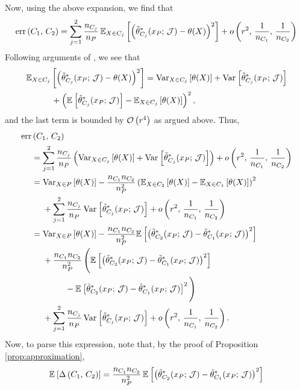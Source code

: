 \documentclass[aos]{imsart}
\theoremstyle{plain}
\theoremstyle{definition}
\theoremstyle{remark}
\begin{document}
\begin{CJK}{UTF8}{gbsn}
{\begin{appendix}
Now, using the above expansion, we find that
\begin{equation*}
\err\p{C_1, \, C_2}  = \sum_{j = 1}^2 \frac{n_{C_j}}{n_P}  \, \EE[X \in C_j]{\p{\ttheta_{C_j}^*(x_P;\,\mathcal{J}) - \theta(X)}^2} +o\p{r^2, \, \frac{1}{n_{C_1}}, \, \frac{1}{n_{C_2}}} 
\end{equation*}
Following arguments of \citet{athey2016recursive}, we see that
\begin{equation*}
\begin{split}
&\EE[X \in C_j]{\p{\ttheta_{C_j}^*(x_P;\,\mathcal{J}) - \theta(X)}^2} = \Var[X \in C_j]{\theta(X)} + \Var{\ttheta_{C_j}^*(x_P;\,\mathcal{J})} \\
&\ \ \ \ \ \ \ \ \ + \p{\EE{\ttheta_{C_j}^*(x_P;\,\mathcal{J})} - \EE[X \in C_j]{\theta(X)}}^2,
\end{split}
\end{equation*}
and the last term is bounded by $\mathcal{O}\left(r^4\right)$ as argued above. Thus,
\begin{align*}
\err&\p{C_1, \, C_2} \\
&= \sum_{j = 1}^2 \frac{n_{C_j}}{n_P} \p{ \Var[X \in C_j]{\theta(X)} + \Var{\ttheta_{C_j}^*(x_P;\,\mathcal{J})} } + o\p{r^2, \, \frac{1}{n_{C_1}}, \, \frac{1}{n_{C_2}}} \\
&= \Var[X \in P]{\theta(X)} - \frac{n_{C_1}n_{C_2}}{n_P^2} \p{\EE[X \in C_2]{\theta(X)} - \EE[X \in C_1]{\theta(X)}}^2  \\
& \ \ \ \  + \sum_{j = 1}^2 \frac{n_{C_j}}{n_P}  \Var{\ttheta_{C_j}^*(x_P;\,\mathcal{J})} + o\p{r^2, \, \frac{1}{n_{C_1}}, \, \frac{1}{n_{C_2}}} \\
&= \Var[X \in P]{\theta(X)} - \frac{n_{C_1}n_{C_2}}{n_P^2}\EE{\p{\ttheta_{C_2}^*(x_P;\,\mathcal{J}) - \ttheta_{C_1}^*(x_P;\,\mathcal{J})}^2} \\
&\ \ \ \ + \frac{n_{C_1}n_{C_2}}{n_P^2} \,\Bigg(\EE{\p{\ttheta_{C_2}^*(x_P;\,\mathcal{J}) - \ttheta_{C_1}^*(x_P;\,\mathcal{J})}^2} \\
&\ \ \ \ \ \ \ \ \ \ \ \ - \EE{\ttheta_{C_2}^*(x_P;\,\mathcal{J}) - \ttheta_{C_1}^*(x_P;\,\mathcal{J})}^2\Bigg) \\
& \ \ \ \ + \sum_{j = 1}^2 \frac{n_{C_j}}{n_P}  \Var{\ttheta_{C_j}^*(x_P;\,\mathcal{J})} + o\p{r^2, \, \frac{1}{n_{C_1}}, \, \frac{1}{n_{C_2}}}.
\end{align*}
Now, to parse this expression, note that, by the proof of Proposition \ref{prop:approximation},
\begin{align*}
&\EE{\Delta\p{C_1, \, C_2}} = \frac{n_{C_1}n_{C_2}}{n_P^2} \, \EE{\p{\ttheta_{C_2}^*(x_P;\,\mathcal{J}) - \ttheta_{C_1}^*(x_P;\,\mathcal{J})}^2} \\

\end{align*}
\end{appendix}}
\end{CJK}
\end{document}
